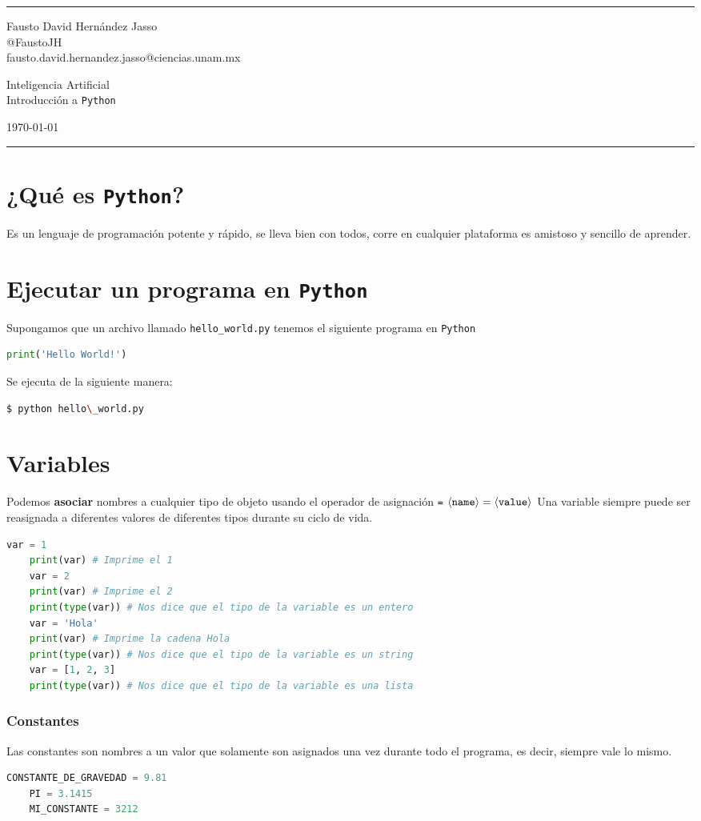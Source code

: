 \documentclass[a4paper]{article}
\begin{document}

\fancyhead[C]{}
\hrule \medskip %
\begin{minipage}{0.295\textwidth} 
\raggedright
\footnotesize
Fausto David Hernández Jasso \hfill\\   
@FaustoJH \hfill\\
fausto.david.hernandez.jasso@ciencias.unam.mx
\end{minipage}
\begin{minipage}{0.4\textwidth} 
\centering 
\large 
Inteligencia Artificial\\ 
\normalsize 
Introducción a \texttt{Python} \\ 
\end{minipage}
\begin{minipage}{0.295\textwidth} 
\raggedleft
\today\hfill\\
\end{minipage}
\medskip\hrule 
\bigskip
\section{¿Qué es \texttt{Python}?}
\noindent
Es un lenguaje de programación potente y rápido, se lleva bien con todos, corre en cualquier plataforma
es amistoso y sencillo de aprender.
\section{Ejecutar un programa en \texttt{Python}}
Supongamos que un archivo llamado \texttt{hello\_world.py} tenemos el siguiente programa en \texttt{Python}
\begin{lstlisting}[language=Python]
    print('Hello World!')
\end{lstlisting}
Se ejecuta de la siguiente manera:
\begin{lstlisting}[language=bash]
    $ python hello\_world.py
\end{lstlisting}
\section{Variables}
\noindent
Podemos \textbf{asociar} nombres a cualquier tipo de objeto usando el operador de asignación 
\texttt{=}
\newline 
\(\langle \text{\texttt{name}} \rangle = \langle \text{\texttt{value}} \rangle\)
\newline 
Una variable siempre puede ser reasignada a diferentes valores de diferentes tipos durante su
ciclo de vida.
\begin{lstlisting}[language=Python]
    var = 1
    print(var) # Imprime el 1
    var = 2
    print(var) # Imprime el 2
    print(type(var)) # Nos dice que el tipo de la variable es un entero
    var = 'Hola'
    print(var) # Imprime la cadena Hola
    print(type(var)) # Nos dice que el tipo de la variable es un string
    var = [1, 2, 3]
    print(type(var)) # Nos dice que el tipo de la variable es una lista
\end{lstlisting}
\subsubsection{Constantes}
\noindent
Las constantes son nombres a un valor que solamente son asignados una vez durante todo el programa,
es decir, siempre vale lo mismo.
\begin{lstlisting}[language=Python]
    CONSTANTE_DE_GRAVEDAD = 9.81
    PI = 3.1415
    MI_CONSTANTE = 3212
\end{lstlisting}
\end{document}

